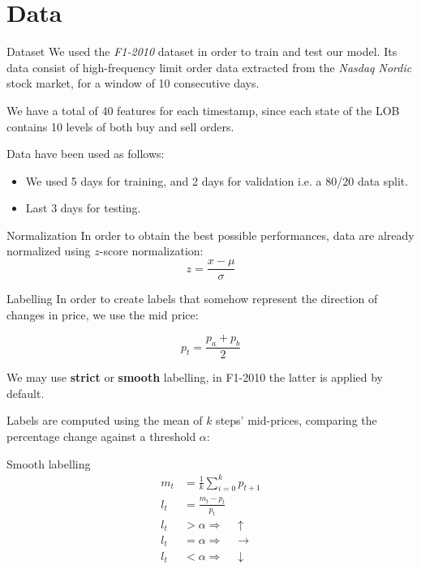 \documentclass{beamer}
\begin{document}
\section{Data}
\begin{frame}{Dataset}
    We used the \textit{F1-2010} dataset in order to train and test our model.
    Its data consist of high-frequency limit order data extracted from the \textit{Nasdaq Nordic} stock market, for a window of 10 consecutive days.
\end{frame}

\begin{frame}
    We have a total of 40 features for each timestamp, since each state of the LOB contains 10 levels of both buy and sell orders.

    Data have been used as follows:
    \begin{itemize}
        \item We used 5 days for training, and 2 days for validation i.e. a 80/20 data split.
        \item Last 3 days for testing.
    \end{itemize}
\end{frame}

\begin{frame}{Normalization}
    In order to obtain the best possible performances, data are already normalized using $z$-score normalization:
    \begin{equation}
        z = \frac{x - \mu}{\sigma}
    \end{equation}
\end{frame}

\begin{frame}{Labelling}
    In order to create labels that somehow represent the direction of changes in price, we use the mid price:

    \begin{equation}
        p_t = \frac{p_a + p_b}{2}
    \end{equation}

    We may use \textbf{strict} or \textbf{smooth} labelling, in F1-2010 the latter is applied by default.

    Labels are computed using the mean of $k$ steps' mid-prices, comparing the percentage change against a threshold $\alpha$:
\end{frame}

\begin{frame}{Smooth labelling}
    \begin{align}
        m_t & = \frac{1}{k} \sum_{i=0}^k p_{t+1}     \\
        l_t & = \frac{m_t - p_t}{p_t}                \\
        l_t & > \alpha \Rightarrow \quad \uparrow    \\
        l_t & = \alpha \Rightarrow \quad \rightarrow \\
        l_t & < \alpha \Rightarrow \quad \downarrow
    \end{align}
\end{frame}
\end{document}
